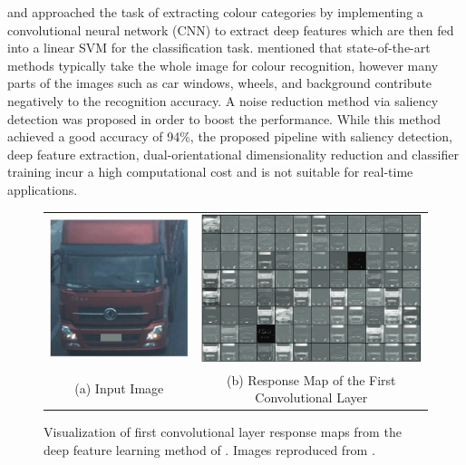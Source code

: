  and  approached the task of extracting colour categories by implementing a convolutional neural network (CNN) to extract deep features which are then fed into a linear SVM for the classification task.  mentioned that state-of-the-art methods typically take the whole image for colour recognition, however many parts of the images such as car windows, wheels, and background contribute negatively to the recognition accuracy. A noise reduction method via saliency detection was proposed in order to boost the performance. While this method achieved a good accuracy of 94\%, the proposed pipeline with saliency detection, deep feature extraction, dual-orientational dimensionality reduction and classifier training incur a high computational cost and is not suitable for real-time applications.

\begin{figure}[!htb] \centering
\begin{tabular}{cc}
 \includegraphics[width=0.4\linewidth]{image/lit/hu1.png} &
 \includegraphics[width=0.6\linewidth]{image/lit/hu2.png} \\
 (a) Input Image & (b) Response Map of the First Convolutional Layer \\
\end{tabular}
\caption[(a) Sample input image and (b) the response from first convolutional layer]{Visualization of first convolutional layer response maps from the deep feature learning method of . Images reproduced from
.
\label{fig:responseFCL}}
\end{figure}

